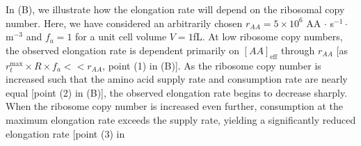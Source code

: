 In (B), we illustrate how the elongation rate will
depend on the ribosomal copy number. Here, we have considered an arbitrarily
chosen $r_{AA} = 5\times 10^6$ AA $\cdot$ s$^{-1} \cdot$ \textmu m$^{-3}$ and
$f_a = 1$ for a unit cell volume $V = 1$fL. At low ribosome copy numbers, the
observed elongation rate is dependent primarily on $[AA]_\text{eff}$ through
$r_{AA}$ [as $r_t^{\text{max}} \times R \times f_a << r_{AA}$, point (1) in
(B)]. As the ribosome copy number is increased
such that the amino acid supply rate and consumption rate are nearly equal
[point (2) in (B)], the observed elongation rate
begins to decrease sharply. When the ribosome copy number is increased even
further, consumption at the maximum elongation rate exceeds the supply rate,
yielding a significantly reduced elongation rate [point (3) in
